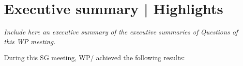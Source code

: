 
\section{Executive summary | Highlights}\label{executive-summary-highlights}

\textit{Include here an executive summary of the executive summaries of Questions of this WP meeting.}

During this SG\studyGroup{} meeting, WP\workingParty/\studyGroup{} achieved the following results:


